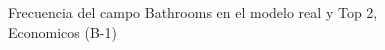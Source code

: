 \begin{figure}[H]
    \centering
    
    \caption{Frecuencia del campo Bathrooms en el modelo real y Top 2, Economicos (B-1)}
    \label{frecuency-Bathrooms-top2}
\end{figure}